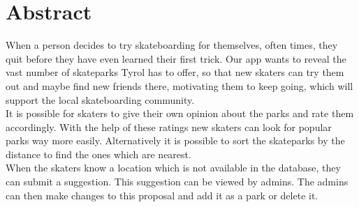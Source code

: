 \section*{Abstract}

When a person decides to try skateboarding for themselves, often times, they quit before they have
even learned their first trick. Our app wants to reveal the vast number of skateparks Tyrol has to
offer, so that new skaters can try them out and maybe find new friends there, motivating them to
keep going, which will support the local skateboarding community. \\

It is possible for skaters to give their own opinion about the parks and rate them accordingly.
With the help of these ratings new skaters can look for popular parks way more easily.
Alternatively it is possible to sort the skateparks by the distance to find the ones which are
nearest. \\

When the skaters know a location which is not available in the database, they can submit a
suggestion. This suggestion can be viewed by admins. The admins can then make changes to this
proposal and add it as a park or delete it.\\

\newpage